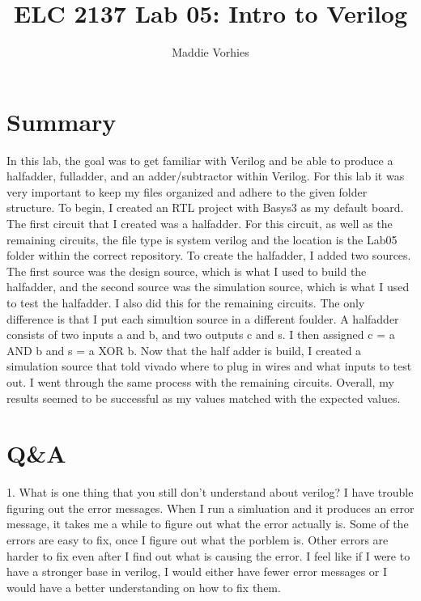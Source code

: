 \documentclass[11pt]{article}
\begin{document}
\title{ELC 2137 Lab 05: Intro to Verilog}
\author{Maddie Vorhies}

\maketitle


\section*{Summary}

In this lab, the goal was to get familiar with Verilog and be able to produce a halfadder, fulladder, and an adder/subtractor within Verilog. For this lab it was very important to keep my files organized and adhere to the given folder structure. To begin, I created an RTL project with Basys3 as my default board. The first circuit that I created was a halfadder. For this circuit, as well as the remaining circuits, the file type is system verilog and the location is the Lab05 folder within the correct repository.  To create the halfadder, I added two sources. The first source was the design source, which is what I used to build the halfadder, and the second source was the simulation source, which is what I used to test the halfadder. I also did this for the remaining circuits. The only difference is that I put each simultion source in a different foulder. A halfadder consists of two inputs a and b, and two outputs c and s. I then assigned c = a AND b and s = a XOR b. Now that the half adder is build, I created a simulation source that told vivado where to plug in wires and what inputs to test out. I went through the same process with the remaining circuits. Overall, my results seemed to be successful as my values matched with the expected values.


\section*{Q\&A}

1. What is one thing that you still don't understand about verilog? \newline
I have trouble figuring out the error messages. When I run a simluation and it produces an error message, it takes me a while to figure out what the error actually is. Some of the errors are easy to fix, once I figure out what the porblem is. Other errors are harder to fix even after I find out what is causing the error. I feel like if I were to have a stronger base in verilog, I would either have fewer error messages or I would have a better understanding on how to fix them. \newline
\end{document}
